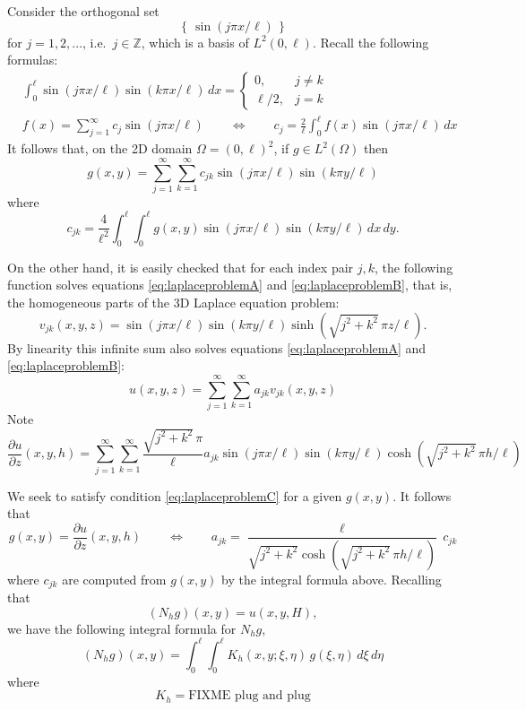 \documentclass[letterpaper,final,12pt,reqno]{amsart}
\theoremstyle{cstyle}
\theoremstyle{cstyle*}
\theoremstyle{dstyle}
\newcommand{\ZZ}{\mathbb{Z}}
\begin{document}
Consider the orthogonal set
    $$\left\{\,\sin(j\pi x/\ell)\,\right\}$$
for $j=1,2,\dots$, i.e.~$j\in \ZZ$, which is a basis of $L^2(0,\ell)$.  Recall the following formulas:
\begin{align*}
&\int_0^\ell \sin(j\pi x/\ell) \sin(k\pi x/\ell)\,dx = \begin{cases} 0, & j \ne k \\ \ell/2, & j=k \end{cases} \\
&f(x) = \sum_{j=1}^\infty c_j \sin(j\pi x/\ell) \qquad \iff \qquad c_j = \frac{2}{\ell} \int_0^\ell f(x) \sin(j\pi x/\ell)\,dx
\end{align*}
It follows that, on the 2D domain $\Omega = (0,\ell)^2$, if $g\in L^2(\Omega)$ then
    $$g(x,y) = \sum_{j=1}^\infty \sum_{k=1}^\infty c_{jk} \sin(j\pi x/\ell) \sin(k\pi y/\ell)$$
where
    $$c_{jk} = \frac{4}{\ell^2} \int_0^\ell \int_0^\ell g(x,y) \sin(j\pi x/\ell) \sin(k\pi y/\ell)\,dx\,dy.$$

On the other hand, it is easily checked that for each index pair $j,k$, the following function solves equations \eqref{eq:laplaceproblemA} and \eqref{eq:laplaceproblemB}, that is, the homogeneous parts of the 3D Laplace equation problem:
    $$v_{jk}(x,y,z) = \sin(j\pi x/\ell) \sin(k\pi y/\ell) \sinh(\sqrt{j^2+k^2}\, \pi z/\ell).$$
By linearity this infinite sum also solves equations \eqref{eq:laplaceproblemA} and \eqref{eq:laplaceproblemB}:
    $$u(x,y,z) = \sum_{j=1}^\infty \sum_{k=1}^\infty a_{jk} v_{jk}(x,y,z)$$
Note
    $$\frac{\partial u}{\partial z}(x,y,h) = \sum_{j=1}^\infty \sum_{k=1}^\infty \frac{\sqrt{j^2+k^2}\, \pi}{\ell} a_{jk} \sin(j\pi x/\ell) \sin(k\pi y/\ell) \cosh(\sqrt{j^2+k^2}\, \pi h/\ell)$$

We seek to satisfy condition \eqref{eq:laplaceproblemC} for a given $g(x,y)$.  It follows that
    $$g(x,y) = \frac{\partial u}{\partial z}(x,y,h) \qquad \iff \qquad a_{jk} = \frac{\ell}{\sqrt{j^2+k^2} \cosh(\sqrt{j^2+k^2}\, \pi h/\ell)} \,c_{jk}$$
where $c_{jk}$ are computed from $g(x,y)$ by the integral formula above.  Recalling that
    $$(N_h g)(x,y) = u(x,y,H),$$
we have the following integral formula for $N_h g$,
    $$(N_h g)(x,y) = \int_0^\ell \int_0^\ell K_h(x,y;\xi,\eta)\, g(\xi,\eta)\,d\xi\,d\eta$$
where
    $$K_h = \text{FIXME plug and plug}$$
\end{document}
